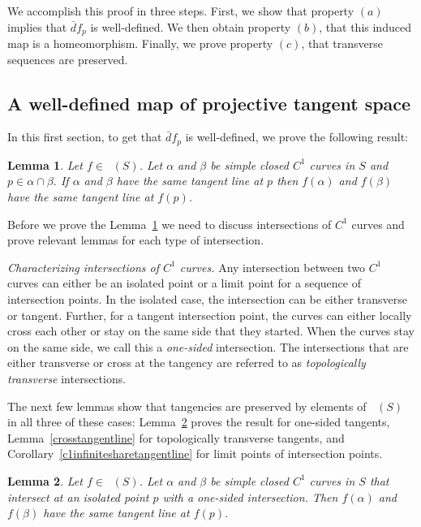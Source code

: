 \documentclass[sn-mathphys-num]{sn-jnl}%
\theoremstyle{thmstyleone}%
\newtheorem{lemma}{Lemma}[section]
\theoremstyle{thmstyletwo}%
\theoremstyle{thmstylethree}%
\DeclareMathOperator{\thomeo}{Homeo^{1}}
\begin{document}
We accomplish this proof in three steps. First, we show that property $(a)$ implies that $\bar{d}f_p$ is well-defined.  We then obtain property $(b)$,  that this induced map is a homeomorphism. Finally, we prove property $(c)$,  that transverse sequences are preserved.

\subsection{A well-defined map of projective tangent space}
In this first section,  to get that $\bar{d}f_p$ is well-defined, we prove the following result:


\begin{lemma}\label{autfinpreservetangent}
Let $f \in \thomeo(S)$.  Let $\alpha$ and $\beta$ be simple closed $C^1$ curves in $S$ and $p \in \alpha \cap \beta$.  If $\alpha$ and $\beta$ have the same tangent line at $p$ then $f(\alpha)$ and $f(\beta)$ have the same tangent line at $f(p)$.
\end{lemma}

Before we prove the Lemma~\ref{autfinpreservetangent}  we need to discuss intersections of $C^1$ curves and prove relevant lemmas for each type of intersection.

\medskip

\noindent \textit{Characterizing intersections of $C^1$ curves.}  Any intersection between two $C^1$ curves can either be an isolated point or a limit point for a sequence of intersection points.  In the isolated case,  the intersection can be either transverse or tangent.  Further, for a tangent intersection point, the curves can either locally cross each other or stay on the same side that they started.   When the curves stay on the same side, we call this a \emph{one-sided} intersection.  The intersections that are either transverse or cross at the tangency are referred to as \emph{topologically transverse} intersections.

The next few lemmas show that tangencies are preserved by elements of $\thomeo(S)$ in all three of these cases: Lemma~\ref{onesidedtangentline} proves the result for one-sided tangents,  Lemma~\ref{crosstangentline} for topologically transverse tangents, and Corollary~\ref{c1infinitesharetangentline} for limit points of intersection points.

\begin{lemma} \label{onesidedtangentline}
Let $f \in \thomeo(S)$.  Let $\alpha$ and $\beta$ be simple closed $C^1$ curves in $S$ that intersect at an isolated point $p$ with a one-sided intersection. Then $f(\alpha)$ and $f(\beta)$ have the same tangent line at $f(p)$.
\end{lemma}
\end{document}
